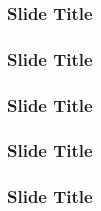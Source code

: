 \documentclass{beamer}
\begin{document}
\begin{frame}
  \frametitle{Slide Title}
\end{frame}
\begin{frame}
  \frametitle{Slide Title}
\end{frame}
\begin{frame}
  \frametitle{Slide Title}
\end{frame}
\begin{frame}
  \frametitle{Slide Title}
\end{frame}
\begin{frame}
  \frametitle{Slide Title}
\end{frame}
\end{document}
